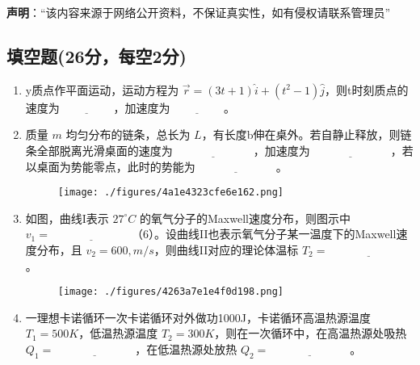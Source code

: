 
\textbf{声明}：“该内容来源于网络公开资料，不保证真实性，如有侵权请联系管理员”

\subsection{填空题(26分，每空2分)}
\begin{enumerate}
        \item y质点作平面运动，运动方程为 $\vec{r} = (3t + 1) \hat{i} + (t^2 - 1) \hat{j}$，则t时刻质点的速度为$\underline{\hspace{2cm}}$，加速度为$\underline{\hspace{2cm}}$。
        
        \item 质量 $m$ 均匀分布的链条，总长为 $L$，有长度b伸在桌外。若自静止释放，则链条全部脱离光滑桌面的速度为$\underline{\hspace{3cm}}$，加速度为$\underline{\hspace{3cm}}$，若以桌面为势能零点，此时的势能为$\underline{\hspace{3cm}}$。
        \begin{figure}[ht]
        \centering
        \texttt{[image: ./figures/4a1e4323cfe6e162.png]}
        \caption{} \label{fig_NIU06_1}
        \end{figure}

        \item 如图，曲线I表示 $27^\circ C$ 的氧气分子的Maxwell速度分布，则图示中 $v_1 = \underline{\hspace{3cm}}$（6）。设曲线II也表示氧气分子某一温度下的Maxwell速度分布，且 $v_2 = 600 , m/s$，则曲线II对应的理论体温标 $T_2 = \underline{\hspace{3cm}}$。
        \begin{figure}[ht]
        \centering
        \texttt{[image: ./figures/4263a7e1e4f0d198.png]}
        \caption{} \label{fig_NIU06_2}
        \end{figure}

        \item 一理想卡诺循环一次卡诺循环对外做功1000J，卡诺循环高温热源温度 $T_1 = 500K$，低温热源温度 $T_2 = 300K$，则在一次循环中，在高温热源处吸热 $Q_1 = \underline{\hspace{3cm}}$，在低温热源处放热 $Q_2 = \underline{\hspace{3cm}}$。
        

\end{enumerate}
